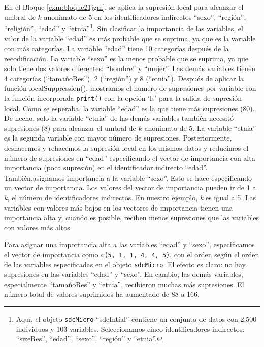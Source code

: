 \documentclass[
]{book}
\theoremstyle{definition}
\theoremstyle{definition}
\theoremstyle{definition}
\theoremstyle{definition}
\theoremstyle{remark}
\begin{document}
En el Bloque \ref{exm:bloque21jgm}, se aplica la supresión local para alcanzar el umbral de \(k\)-anonimato de 5 en los identificadores indirectos ``sexo'', ``región'', ``religión'', ``edad'' y ``etnia''\footnote{Aquí, el objeto \texttt{sdcMicro} ``sdcIntial'' contiene un conjunto de datos con 2.500 individuos y 103 variables. Seleccionamos cinco identificadores indirectos: ``sizeRes'', ``edad'', ``sexo'', ``región'' y ``etnia''.}. Sin clasificar la importancia de las variables, el valor de la variable ``edad'' es más probable que se suprima, ya que es la variable con más categorías. La variable ``edad'' tiene 10 categorías después de la recodificación. La variable ``sexo'' es la menos probable que se suprima, ya que solo tiene dos valores diferentes: ``hombre'' y ``mujer''. Las demás variables tienen 4 categorías (``tamañoRes''), 2 (``región'') y 8 (``etnia''). Después de aplicar la función localSuppression(), mostramos el número de supresiones por variable con la función incorporada \texttt{print()} con la opción `ls' para la salida de supresión local. Como se esperaba, la variable ``edad'' es la que tiene más supresiones (80). De hecho, solo la variable ``etnia'' de las demás variables también necesitó supresiones (8) para alcanzar el umbral de \(k\)-anonimato de 5. La variable ``etnia'' es la segunda variable con mayor número de supresiones. Posteriormente, deshacemos y rehacemos la supresión local en los mismos datos y reducimos el número de supresiones en ``edad'' especificando el vector de importancia con alta importancia (poca supresión) en el identificador indirecto ``edad''. También,asignamos importancia a la variable ``sexo''. Esto se hace especificando un vector de importancia. Los valores del vector de importancia pueden ir de 1 a \emph{k}, el número de identificadores indirectos. En nuestro ejemplo, \emph{k} es igual a 5. Las variables con valores más bajos en los vectores de importancia tienen una importancia alta y, cuando es posible, reciben menos supresiones que las variables con valores más altos.

Para asignar una importancia alta a las variables ``edad'' y ``sexo'', especificamos el vector de importancia como \texttt{c(5,\ 1,\ 1,\ 4,\ 4,\ 5)}, con el orden según el orden de las variables especificadas en el objeto \texttt{sdcMicro}. El efecto es claro: no hay supresiones en las variables ``edad'' y ``sexo''. En cambio, las demás variables, especialmente ``tamañoRes'' y ``etnia'', recibieron muchas más supresiones. El número total de valores suprimidos ha aumentado de 88 a 166.
\end{document}
